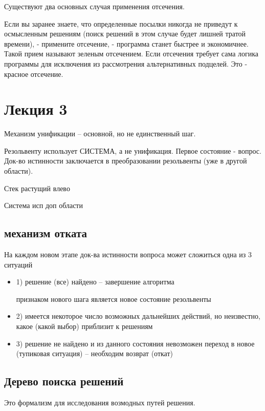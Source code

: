 \documentclass[12pt]{report}
\begin{document}
Существуют два основных случая применения отсечения.

Если вы заранее знаете, что определенные посылки никогда не приведут к осмысленным решениям (поиск решений в этом случае будет лишней тратой времени), - примените отсечение, - программа станет быстрее и экономичнее. Такой прием называют зеленым отсечением.
Если отсечения требует сама логика программы для исключения из рассмотрения альтернативных подцелей. Это - красное отсечение.

\chapter{Лекция 3}


Механизм  унификации -- основной, но не единственный шаг.

Резольвенту использует СИСТЕМА, а не унификация. Первое состояние - вопрос. Док-во истинности заключается в преобразовании резольвенты (уже в другой области).

Стек растущий влево

Система исп доп области


\section{механизм отката}


На каждом новом этапе док-ва истинности вопроса может сложиться одна из 3 ситуаций

\begin{itemize}
\item 1) решение (все) найдено -- завершение алгоритма

признаком нового шага является новое состояние резольвенты 

\item 2) имеется некоторое число возможных дальнейших действий, но неизвестно, какое (какой выбор) приблизит к решениям

\item 3) решение не найдено и из данного состояния  невозможен переход в новое (тупиковая ситуация) -- необходим возврат (откат)

\end{itemize}

\section{Дерево поиска решений}
 
Это формализм для исследования возмодных  путей решения.
 
\end{document}

